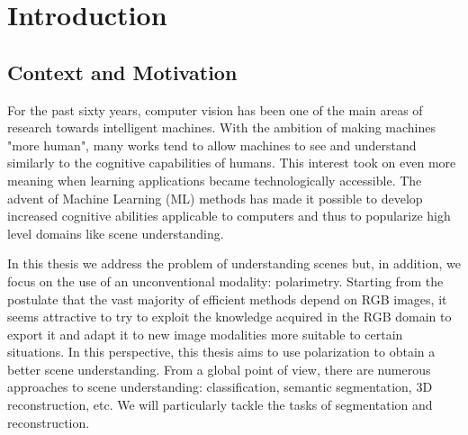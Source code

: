 
\chapter{Introduction} %

\label{Chapter1} %


\newcommand{\keyword}[1]{\textbf{#1}}
\newcommand{\tabhead}[1]{\textbf{#1}}
\newcommand{\code}[1]{\texttt{#1}}
\newcommand{\file}[1]{\texttt{\bfseries#1}}
\newcommand{\option}[1]{\texttt{\itshape#1}}


\section{Context and Motivation}

For the past sixty years, computer vision has been one of the main areas of research towards intelligent machines. With the ambition of making machines "more human", many works tend to allow machines to see and understand similarly to the cognitive capabilities of humans. This interest took on even more meaning when learning applications became technologically accessible. The advent of Machine Learning (ML) methods has made it possible to develop increased cognitive abilities applicable to computers and thus to popularize high level domains like scene understanding.

In this thesis we address the problem of understanding scenes but, in addition, we focus on the use of an unconventional modality: polarimetry. Starting from the postulate that the vast majority of efficient methods depend on RGB images, it seems attractive to try to exploit the knowledge acquired in the RGB domain to export it and adapt it to new image modalities more suitable to certain situations.
In this perspective, this thesis aims to use polarization to obtain a better scene understanding.
From a global point of view, there are numerous approaches to scene understanding: classification, semantic segmentation, 3D reconstruction, etc. We will particularly tackle the tasks of segmentation and reconstruction. 



